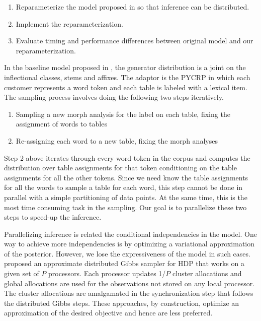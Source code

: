 \documentclass{article}
\begin{document}
\begin{enumerate}[1.]
\item Reparameterize the model proposed in \cite{goldwater2011} so
  that inference can be distributed.
\item Implement the reparameterization.
\item Evaluate timing and performance differences between original
  model and our reparameterization.
\end{enumerate}

In the baseline model proposed in \cite{goldwater2011}, the 
generator distribution is a joint on the inflectional classes, stems 
and affixes. The adaptor is the PYCRP in which each customer represents 
a word token and each table is labeled with a lexical item. The sampling 
process involves doing the following two steps iteratively.

\begin{enumerate}[1.]
\item Sampling a new morph analysis for the label on each table,
fixing the assignment of words to tables
\item Re-assigning each word to a new table, fixing the morph analyses
\end{enumerate}

Step 2 above iterates through every word token in the corpus and computes
the distribution over table assignments for that token conditioning on 
the table assignments for all the other tokens. Since we need know the 
table assignments for all the words to sample a table for each word, this
step cannot be done in parallel with a simple partitioning of data points. 
At the same time, this is the most time consuming task in the sampling. 
Our goal is to parallelize these two steps to speed-up the inference.

Parallelizing inference is related the conditional independencies in the 
model. One way to achieve more independencies is by optimizing a variational 
approximation of the posterior. However, we lose the expressiveness of the 
model in such cases. \cite{asuncion2008asynchronous} proposed an approximate
distributed Gibbs sampler for HDP that works on a given set of $P$ processors.
Each processor updates 1/$P$ cluster allocations and global allocations are 
used for the observations not stored on any local processor. The cluster
allocations are amalgamated in the synchronization step that follows the 
distributed Gibbs steps. These approaches, by construction, optimize an 
approximation of the desired objective and hence are less preferred.
\end{document}
